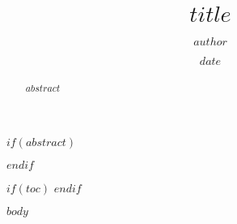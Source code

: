 \documentclass[$if(fontsize)$$fontsize$,$endif$$if(lang)$$babel-lang$,$endif$$if(papersize)$$papersize$,$endif$$for(classoption)$$classoption$$sep$,$endfor$]{$documentclass$}
\title{$title$}
\author{$author$}
\date{$date$}
\begin{document}
\maketitle

$if(abstract)$
\begin{abstract}
$abstract$
\end{abstract}
$endif$

$if(toc)$
\tableofcontents
\newpage
$endif$

$body$
\end{document}
